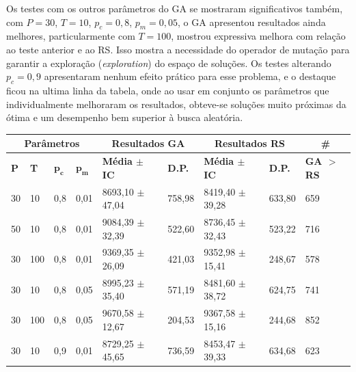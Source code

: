 Os testes com os outros parâmetros do GA se mostraram significativos também, com \(P = 30\), \(T = 10\), \(p_c = 0,8\), \(p_m = 0,05\), o GA apresentou resultados ainda melhores, particularmente com \(T=100\), mostrou expressiva melhora com relação ao teste anterior e ao RS. Isso mostra a necessidade do operador de mutação para garantir a exploração (\textit{exploration}) do espaço de soluções. Os testes alterando \(p_c = 0,9\) apresentaram nenhum efeito prático para esse problema, e o destaque ficou na ultima linha da tabela, onde ao usar em conjunto os parâmetros que individualmente melhoraram os resultados, obteve-se soluções muito próximas da ótima e um desempenho bem superior à busca aleatória.

\begin{table}[h]
	\begin{tabular}{|l|l|l|l|l|l|l|l|l|}
		\hline
		\multicolumn{4}{|c|}{\textbf{Parâmetros}} & \multicolumn{2}{c|}{\textbf{Resultados GA}} & \multicolumn{2}{c|}{\textbf{Resultados RS}} & \multicolumn{1}{c|}{\textbf{\#}} \\ \hline
		\textbf{P}     & \textbf{T}      & $\bm{p_c}$   & $\bm{p_m}$   & \textbf{Média $\pm$ IC}            & \textbf{D.P.}       & \textbf{Média $\pm$ IC}              & \textbf{D.P.}           & \textbf{GA $>$ RS}                                                               \\ \hline
		30    & 10     & 0,8	& 0,01    & 8693,10 $\pm$ 47,04     & 758,98    & 8419,40 $\pm$ 39,28       & 633,80        & 659                                                            \\ \hline
		50    & 10     & 0,8	& 0,01    & 9084,39 $\pm$ 32,39     & 522,60    & 8736,45 $\pm$ 32,43       & 523,22        & 716                                                            \\ \hline
		30    & 100    & 0,8	& 0,01    & 9369,35 $\pm$ 26,09     & 421,03    & 9352,98 $\pm$ 15,41       & 248,67        & 578                                                            \\ \hline
		30    & 10     & 0,8	& 0,05    & 8995,23 $\pm$ 35,40     & 571,19    & 8481,60 $\pm$ 38,72       & 624,75        & 741                                                            \\ \hline
		30    & 100    & 0,8	& 0,05    & 9670,58 $\pm$ 12,67     & 204,53    & 9367,58 $\pm$ 15,16       & 244,68        & 852                                                            \\ \hline
		30    & 10     & 0,9	& 0,01    & 8729,25 $\pm$ 45,65     & 736,59    & 8453,47 $\pm$ 39,33       & 634,68        & 623                                                            \\ \hline

\end{tabular}
\end{table}
